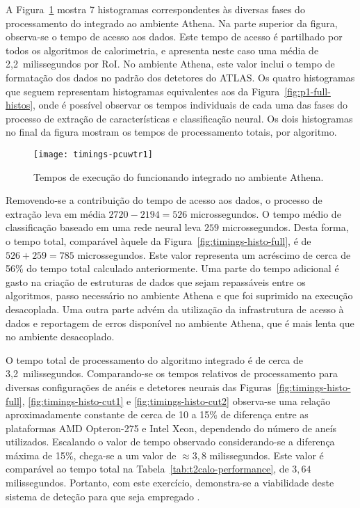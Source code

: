 A Figura~\ref{fig:timings-athena} mostra 7 histogramas correspondentes às
diversas fases do processamento do  integrado ao ambiente
Athena. Na parte superior da figura, observa-se o tempo de acesso aos
dados. Este tempo de acesso é partilhado por todos os algoritmos de
calorimetria, e apresenta neste caso uma média de 2,2~milissegundos por
RoI. No ambiente Athena, este valor inclui o tempo de formatação dos dados no
padrão dos detetores do ATLAS. Os quatro histogramas que seguem representam
histogramas equivalentes aos da Figura~\ref{fig:p1-full-histos}, onde é
possível observar os tempos individuais de cada uma das fases do processo de
extração de características e classificação neural. Os dois histogramas no
final da figura mostram os tempos de processamento totais, por algoritmo.

\begin{figure}
\begin{center}
\texttt{[image: timings-pcuwtr1]}
\end{center}
\caption{Tempos de execução do  funcionando integrado no
ambiente Athena.}
\label{fig:timings-athena}
\end{figure}

Removendo-se a contribuição do tempo de acesso aos dados, o processo de
extração leva em média $2720-2194=526$ microssegundos. O tempo médio de
classificação baseado em uma rede neural leva $259$ microssegundos. Desta
forma, o tempo total, comparável àquele da
Figura~\ref{fig:timings-histo-full}, é de $526+259=785$ microssegundos. Este
valor representa um acréscimo de cerca de 56\% do tempo total calculado
anteriormente. Uma parte do tempo adicional é gasto na criação de estruturas
de dados que sejam repassáveis entre os algoritmos, passo necessário no
ambiente Athena e que foi suprimido na execução desacoplada. Uma outra parte
advém da utilização da infrastrutura de acesso à dados e reportagem de erros
disponível no ambiente Athena, que é mais lenta que no ambiente desacoplado.

O tempo total de processamento do algoritmo integrado é de cerca de
3,2~milissegundos. Comparando-se os tempos relativos de processamento para
diversas configurações de anéis e detetores neurais das
Figuras~\ref{fig:timings-histo-full}, \ref{fig:timings-histo-cut1} e
\ref{fig:timings-histo-cut2} observa-se uma relação aproximadamente constante
de cerca de 10 a 15\% de diferença entre as plataformas AMD Opteron-275 e
Intel Xeon, dependendo do número de aneís utilizados. Escalando o valor de
tempo observado considerando-se a diferença máxima de 15\%, chega-se a um
valor de $\approx 3,8$ milissegundos. Este valor é comparável ao tempo total
na Tabela~\ref{tab:t2calo-performance}, de $3,64$ milissegundos. Portanto, com
este exercício, demonstra-se a viabilidade deste sistema de deteção para que
seja empregado .


